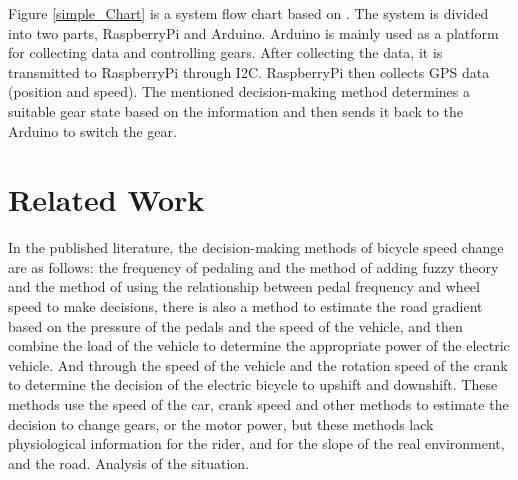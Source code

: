 \documentclass[conference]{IEEEtran}
\begin{document}
Figure \ref{simple_Chart} is a system flow chart based on \cite{9026293}. The system is divided into two parts, RaspberryPi and Arduino. Arduino is mainly used as a platform for collecting data and controlling gears. After collecting the data, it is transmitted to RaspberryPi through I2C. RaspberryPi then collects GPS data (position and speed). The mentioned decision-making method determines a suitable gear state based on the information and then sends it back to the Arduino to switch the gear.

\section{Related Work}

In the published literature, the decision-making methods of bicycle speed change are as follows: the frequency of pedaling and the method of adding fuzzy theory \, and the method of using the relationship between pedal frequency and wheel speed to make decisions, there is also a method to estimate the road gradient based on the pressure of the pedals and the speed of the vehicle, and then combine the load of the vehicle to determine the appropriate power of the electric vehicle\cite{kai2017control}. And through the speed of the vehicle and the rotation speed of the crank to determine the decision of the electric bicycle to upshift and downshift. These methods use the speed of the car, crank speed and other methods to estimate the decision to change gears, or the motor power, but these methods lack physiological information for the rider, and for the slope of the real environment, and the road. Analysis of the situation.

\end{document}
